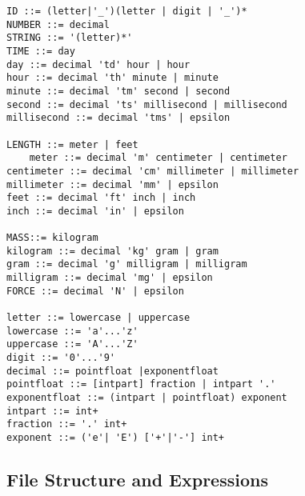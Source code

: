 \documentclass[letterpaper]{article}
\begin{document}
\begin{verbatim}
ID ::= (letter|'_')(letter | digit | '_')*
NUMBER ::= decimal
STRING ::= '(letter)*'
TIME ::= day
day ::= decimal 'td' hour | hour
hour ::= decimal 'th' minute | minute
minute ::= decimal 'tm' second | second
second ::= decimal 'ts' millisecond | millisecond 
millisecond ::= decimal 'tms' | epsilon

LENGTH ::= meter | feet
	meter ::= decimal 'm' centimeter | centimeter
centimeter ::= decimal 'cm' millimeter | millimeter
millimeter ::= decimal 'mm' | epsilon
feet ::= decimal 'ft' inch | inch
inch ::= decimal 'in' | epsilon

MASS::= kilogram
kilogram ::= decimal 'kg' gram | gram
gram ::= decimal 'g' milligram | milligram
milligram ::= decimal 'mg' | epsilon
FORCE ::= decimal 'N' | epsilon

letter ::= lowercase | uppercase
lowercase ::= 'a'...'z'
uppercase ::= 'A'...'Z'
digit ::= '0'...'9'
decimal ::= pointfloat |exponentfloat
pointfloat ::= [intpart] fraction | intpart '.'
exponentfloat ::= (intpart | pointfloat) exponent
intpart ::= int+
fraction ::= '.' int+
exponent ::= ('e'| 'E') ['+'|'‐'] int+
\end{verbatim}

\subsection{File Structure and Expressions}
\end{document}
